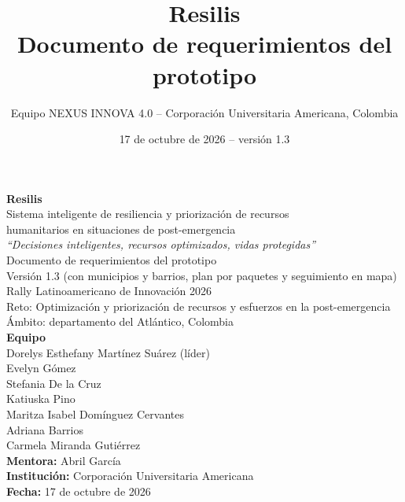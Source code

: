 \documentclass[11pt,a4paper]{article}
\title{\textbf{Resilis}\\[2pt]\large Documento de requerimientos del prototipo}
\author{Equipo NEXUS INNOVA 4.0 -- Corporación Universitaria Americana, Colombia}
\date{17 de octubre de 2026 -- versión 1.3}
\begin{document}
\begin{titlepage}
\centering
\vspace*{2.5cm}
{\Huge\bfseries\color{resilis} Resilis}\\[0.6cm]
{\large Sistema inteligente de resiliencia y priorización de recursos\\humanitarios en situaciones de post-emergencia}\\[1.2cm]
{\itshape ``Decisiones inteligentes, recursos optimizados, vidas protegidas''}\\[2cm]
{\Large Documento de requerimientos del prototipo}\\[0.4cm]
{\large Versión 1.3 (con municipios y barrios, plan por paquetes y seguimiento en mapa)}\\[2cm]
Rally Latinoamericano de Innovación 2026\\
Reto: Optimización y priorización de recursos y esfuerzos en la post-emergencia\\[1cm]
Ámbito: departamento del Atlántico, Colombia\\[2cm]
\textbf{Equipo}\\[4pt]
Dorelys Esthefany Martínez Suárez (líder)\\
Evelyn Gómez\\
Stefania De la Cruz\\
Katiuska Pino\\
Maritza Isabel Domínguez Cervantes\\
Adriana Barrios\\
Carmela Miranda Gutiérrez\\[8pt]
\textbf{Mentora:} Abril García\\[8pt]
\textbf{Institución:} Corporación Universitaria Americana\\
\textbf{Fecha:} 17 de octubre de 2026
\vfill
\end{titlepage}

\tableofcontents
\newpage












\printbibliography[title={Referencias}]
\end{document}

